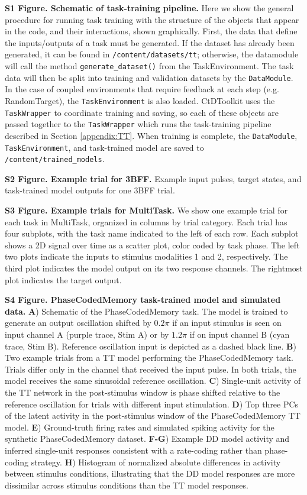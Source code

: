 \documentclass{article}
\begin{document}
\noindent\textbf{S1 Figure. Schematic of task-training pipeline.}
Here we show the general procedure for running task training with the structure of the objects that appear in the code, and their interactions, shown graphically. First, the data that define the inputs/outputs of a task must be generated. If the dataset has already been generated, it can be found in \texttt{/content/datasets/tt}; otherwise, the datamodule will call the method \texttt{generate\_dataset()} from the TaskEnvironment. The task data will then be split into training and validation datasets by the \texttt{DataModule}. In the case of coupled environments that require feedback at each step (e.g. RandomTarget), the \texttt{TaskEnvironment} is also loaded. CtDToolkit uses the \texttt{TaskWrapper} to coordinate training and saving, so each of these objects are passed together to the \texttt{TaskWrapper} which runs the task-training pipeline described in Section \ref{appendix:TT}. When training is complete, the \texttt{DataModule}, \texttt{TaskEnvironment}, and task-trained model are saved to \texttt{/content/trained\_models}.

\noindent\textbf{S2 Figure. Example trial for 3BFF.}
Example input pulses, target states, and task-trained model outputs for one 3BFF trial.

\noindent\textbf{S3 Figure. Example trials for MultiTask.}
We show one example trial for each task in MultiTask, organized in columns by trial category. Each trial has four subplots, with the task name indicated to the left of each row. Each subplot shows a 2D signal over time as a scatter plot, color coded by task phase. The left two plots indicate the inputs to stimulus modalities 1 and 2, respectively. The third plot indicates the model output on its two response channels. The rightmost plot indicates the target output.

\noindent\textbf{S4 Figure. PhaseCodedMemory task-trained model and simulated data.}
\textbf{A}) Schematic of the PhaseCodedMemory task. The model is trained to generate an output oscillation shifted by $0.2\pi$ if an input stimulus is seen on input channel A (purple trace, Stim A) or by $1.2\pi$ if on input channel B (cyan trace, Stim B). Reference oscillation input is depicted as a dashed black line. \textbf{B}) Two example trials from a TT model performing the PhaseCodedMemory task. Trials differ only in the channel that received the input pulse. In both trials, the model receives the same sinusoidal reference oscillation. \textbf{C}) Single-unit activity of the TT network in the post-stimulus window is phase shifted relative to the reference oscillation for trials with different input stimulation. \textbf{D}) Top three PCs of the latent activity in the post-stimulus window of the PhaseCodedMemory TT model. \textbf{E}) Ground-truth firing rates and simulated spiking activity for the synthetic PhaseCodedMemory dataset. \textbf{F-G}) Example DD model activity and inferred single-unit responses consistent with a rate-coding rather than phase-coding strategy. \textbf{H}) Histogram of normalized absolute differences in activity between stimulus conditions, illustrating that the DD model responses are more dissimilar across stimulus conditions than the TT model responses.
\end{document}
